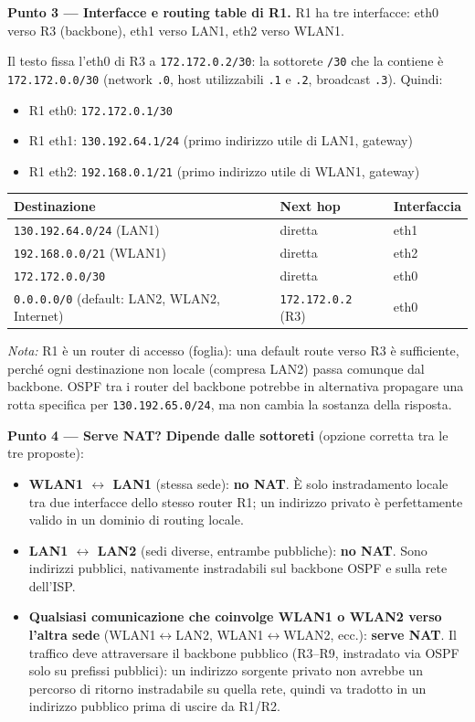 \documentclass[12pt, a4paper]{article}
\begin{document}
\textbf{Punto 3 --- Interfacce e routing table di R1.} R1 ha tre interfacce: eth0 verso R3 (backbone), eth1 verso LAN1, eth2 verso WLAN1.

Il testo fissa l'eth0 di R3 a \texttt{172.172.0.2/30}: la sottorete \texttt{/30} che la contiene è \texttt{172.172.0.0/30} (network \texttt{.0}, host utilizzabili \texttt{.1} e \texttt{.2}, broadcast \texttt{.3}). Quindi:
\begin{itemize}
    \item R1 eth0: \texttt{172.172.0.1/30}
    \item R1 eth1: \texttt{130.192.64.1/24} (primo indirizzo utile di LAN1, gateway)
    \item R1 eth2: \texttt{192.168.0.1/21} (primo indirizzo utile di WLAN1, gateway)
\end{itemize}

\begin{center}
\begin{tabular}{|l|l|l|}
\hline
\textbf{Destinazione} & \textbf{Next hop} & \textbf{Interfaccia} \\
\hline
\texttt{130.192.64.0/24} (LAN1) & diretta & eth1 \\
\texttt{192.168.0.0/21} (WLAN1) & diretta & eth2 \\
\texttt{172.172.0.0/30} & diretta & eth0 \\
\texttt{0.0.0.0/0} (default: LAN2, WLAN2, Internet) & \texttt{172.172.0.2} (R3) & eth0 \\
\hline
\end{tabular}
\end{center}
\textit{Nota:} R1 è un router di accesso (foglia): una default route verso R3 è sufficiente, perché ogni destinazione non locale (compresa LAN2) passa comunque dal backbone. OSPF tra i router del backbone potrebbe in alternativa propagare una rotta specifica per \texttt{130.192.65.0/24}, ma non cambia la sostanza della risposta.

\textbf{Punto 4 --- Serve NAT?} \textbf{Dipende dalle sottoreti} (opzione corretta tra le tre proposte):
\begin{itemize}
    \item \textbf{WLAN1 $\leftrightarrow$ LAN1} (stessa sede): \textbf{no NAT}. È solo instradamento locale tra due interfacce dello stesso router R1; un indirizzo privato è perfettamente valido in un dominio di routing locale.
    \item \textbf{LAN1 $\leftrightarrow$ LAN2} (sedi diverse, entrambe pubbliche): \textbf{no NAT}. Sono indirizzi pubblici, nativamente instradabili sul backbone OSPF e sulla rete dell'ISP.
    \item \textbf{Qualsiasi comunicazione che coinvolge WLAN1 o WLAN2 verso l'altra sede} (WLAN1$\leftrightarrow$LAN2, WLAN1$\leftrightarrow$WLAN2, ecc.): \textbf{serve NAT}. Il traffico deve attraversare il backbone pubblico (R3--R9, instradato via OSPF solo su prefissi pubblici): un indirizzo sorgente privato non avrebbe un percorso di ritorno instradabile su quella rete, quindi va tradotto in un indirizzo pubblico prima di uscire da R1/R2.
\end{itemize}
\end{document}
